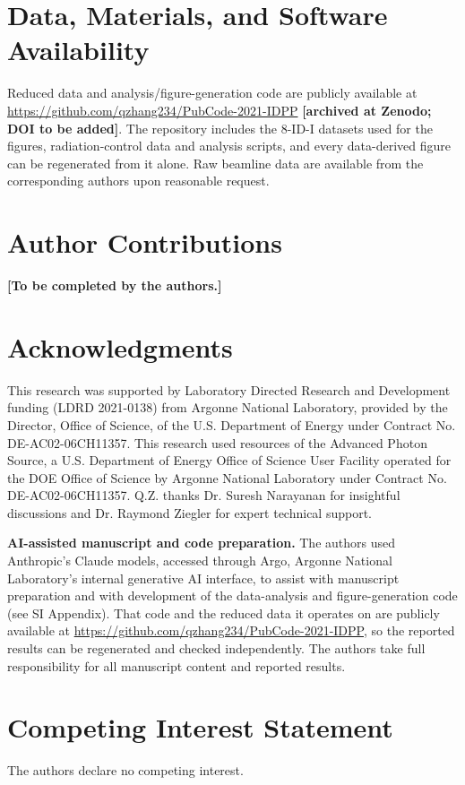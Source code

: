 \documentclass[journal=nalefd,manuscript=letter,layout=traditional]{achemso}
\begin{document}
\section*{Data, Materials, and Software Availability}
Reduced data and analysis/figure-generation code are publicly available at \url{https://github.com/qzhang234/PubCode-2021-IDPP} \textbf{[archived at Zenodo; DOI to be added]}. The repository includes the 8-ID-I datasets used for the figures, radiation-control data and analysis scripts, and every data-derived figure can be regenerated from it alone. Raw beamline data are available from the corresponding authors upon reasonable request.

\section*{Author Contributions}
\textbf{[To be completed by the authors.]}

\section*{Acknowledgments}
This research was supported by Laboratory Directed Research and Development funding (LDRD 2021-0138) from Argonne National Laboratory, provided by the Director, Office of Science, of the U.S. Department of Energy under Contract No. DE-AC02-06CH11357. This research used resources of the Advanced Photon Source, a U.S. Department of Energy Office of Science User Facility operated for the DOE Office of Science by Argonne National Laboratory under Contract No. DE-AC02-06CH11357. Q.Z. thanks Dr. Suresh Narayanan for insightful discussions and Dr. Raymond Ziegler for expert technical support.

\textbf{AI-assisted manuscript and code preparation.} The authors used Anthropic's Claude models, accessed through Argo, Argonne National Laboratory's internal generative AI interface, to assist with manuscript preparation and with development of the data-analysis and figure-generation code (see SI Appendix). That code and the reduced data it operates on are publicly available at \url{https://github.com/qzhang234/PubCode-2021-IDPP}, so the reported results can be regenerated and checked independently. The authors take full responsibility for all manuscript content and reported results.

\section*{Competing Interest Statement}
The authors declare no competing interest.


\end{document}
